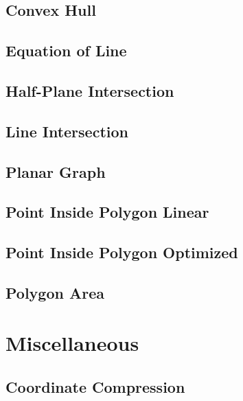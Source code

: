 \subsection{Convex Hull}
\raggedbottom
\hrulefill
\subsection{Equation of Line}
\raggedbottom
\hrulefill
\subsection{Half-Plane Intersection}
\raggedbottom
\hrulefill
\subsection{Line Intersection}
\raggedbottom
\hrulefill
\subsection{Planar Graph}
\raggedbottom
\hrulefill
\subsection{Point Inside Polygon Linear}
\raggedbottom
\hrulefill
\subsection{Point Inside Polygon Optimized}
\raggedbottom
\hrulefill
\subsection{Polygon Area}
\raggedbottom
\hrulefill

\section{Miscellaneous}
\subsection{Coordinate Compression}
\raggedbottom
\hrulefill

